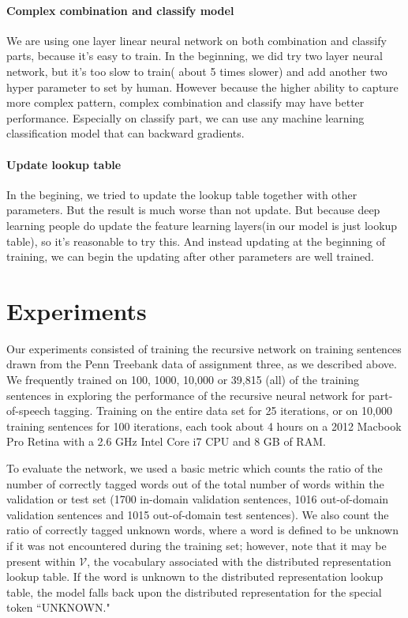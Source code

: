 \documentclass[11pt]{article}
\begin{document}
\paragraph{Complex combination and classify model}
We are using one layer linear neural network on both combination and classify parts, because it's easy to train. In the beginning, we did try two layer neural network, but it's too slow to train( about 5 times slower) and add another two hyper parameter to set by human. However because the higher ability to capture more complex pattern, complex combination and classify may have better performance. Especially on classify part, we can use any machine learning classification model that can backward gradients.

\paragraph{Update lookup table}
In the begining, we tried to update the lookup table together with other parameters. But the result is much worse than not update. But because deep learning people do update the feature learning layers(in our model is just lookup table), so it's reasonable to try this. And instead updating at the beginning of training, we can begin the updating after other parameters are well trained.

\section{Experiments}

Our experiments consisted of training the recursive network on training sentences drawn from the Penn Treebank data of assignment three, as we described above. We frequently trained on 100, 1000, 10,000 or 39,815 (all) of the training sentences in exploring the performance of the recursive neural network for part-of-speech tagging. Training on the entire data set for 25 iterations, or on 10,000 training sentences for 100 iterations, each took about 4 hours on a 2012 Macbook Pro Retina with a 2.6 GHz Intel Core i7 CPU and 8 GB of RAM.

To evaluate the network, we used a basic metric which counts the ratio of the number of correctly tagged words out of the total number of words within the validation or test set (1700 in-domain validation sentences, 1016 out-of-domain validation sentences and 1015 out-of-domain test sentences). We also count the ratio of correctly tagged unknown words, where a word is defined to be unknown if it was not encountered during the training set; however, note that it may be present within $\mathcal{V}$, the vocabulary associated with the distributed representation lookup table. If the word is unknown to the distributed representation lookup table, the model falls back upon the distributed representation for the special token ``UNKNOWN."
\end{document}
